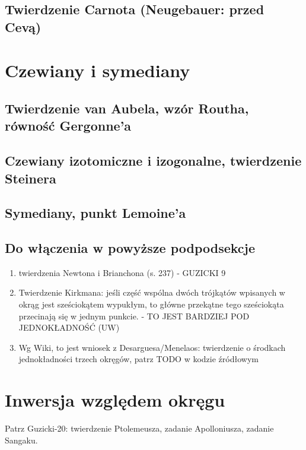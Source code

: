 \subsection{Twierdzenie Carnota (Neugebauer: przed Cevą)}


\section{Czewiany i symediany}
\subsection{Twierdzenie van Aubela, wzór Routha, równość Gergonne'a}
\subsection{Czewiany izotomiczne i izogonalne, twierdzenie Steinera}
\subsection{Symediany, punkt Lemoine'a}


\subsection{Do włączenia w powyższe podpodsekcje}
\begin{enumerate}
    \item twierdzenia Newtona i Brianchona (s. 237) - GUZICKI 9
    \item Twierdzenie Kirkmana: jeśli część wspólna dwóch trójkątów wpisanych w okrąg jest sześciokątem wypukłym, to główne przekątne tego sześciokąta przecinają się w jednym punkcie. - TO JEST BARDZIEJ POD JEDNOKŁADNOŚĆ (UW)
    \item Wg Wiki, to jest wniosek z Desarguesa/Menelaos: twierdzenie o środkach jednokładności trzech okręgów, patrz TODO w kodzie źródłowym %
\end{enumerate}

\section{Inwersja względem okręgu}
Patrz Guzicki-20: twierdzenie Ptolemeusza, zadanie Apolloniusza, zadanie Sangaku.

